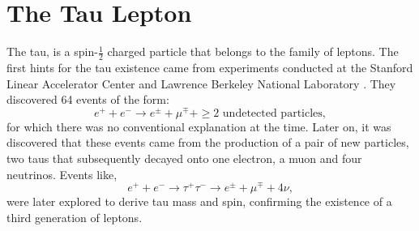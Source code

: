 \section{The Tau Lepton}\label{chap2sec1}
The tau, is a spin-$\frac{1}{2}$ charged particle that belongs to the family of leptons. The first hints for the tau existence came from experiments conducted at the Stanford Linear Accelerator Center and Lawrence Berkeley National Laboratory \cite{PhysRevLett.35.1489}. They discovered 64 events of the form:
\begin{equation}
	e^+ + e^- \to e^\pm + \mu^\mp + \geq \text{2 undetected particles},
\end{equation}
for which there was no conventional explanation at the time. Later on, it was discovered that these events came from the production of a pair of new particles, two taus that subsequently decayed onto one electron, a muon and four neutrinos. Events like,
\begin{equation}
e^+ + e^- \to \tau^+ \tau^- \to e^\pm + \mu^\mp + 4\nu,
\end{equation}	
were later explored to derive tau mass and spin, confirming the existence of a third generation of leptons. 

